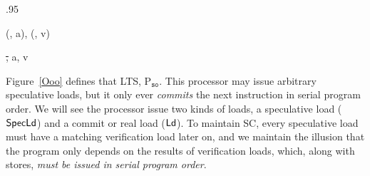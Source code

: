 \begin{figure*}[t]
\small
\centering
\begin{boxedminipage}[c]{.95\textwidth}
\inference[Fetch]
{}
{}

\inference[Compute]
{\get\spc\ld(\rob) = \epsilon}
{}

{
{(\ld\req, a), (\ld\resp, v)}}


{}

{}

{}

{
{\st, a, v}}

{}

{}
\end{boxedminipage}

\caption{Speculating, out-of-order issue processor}
\label{Ooo}
\end{figure*}

Figure~\ref{Ooo} defines that LTS,
P$_{\texttt{so}}$. This processor may issue arbitrary speculative
loads, but it only ever \emph{commits} the next instruction in serial
program order. 
We will see the processor issue two kinds of loads, a speculative
load ($\mathsf{Spec}\mathsf{Ld}$) and a commit or real load ($\mathsf{Ld}$).  To maintain SC, every speculative
load must have a matching verification load later on, and we maintain
the illusion that the program only depends on the results of
verification loads, which, along with stores, \emph{must be issued in
serial program order}.

